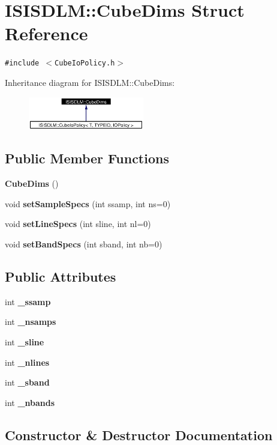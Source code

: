 \section{ISISDLM::Cube\-Dims Struct Reference}
\label{structISISDLM_1_1CubeDims}
{\tt \#include $<$Cube\-Io\-Policy.h$>$}

Inheritance diagram for ISISDLM::Cube\-Dims:\begin{figure}[H]
\begin{center}
\leavevmode
\includegraphics[width=143pt]{structISISDLM_1_1CubeDims__inherit__graph}
\end{center}
\end{figure}
\subsection*{Public Member Functions}
\begin{CompactItemize}
\item 
{\bf Cube\-Dims} ()
\item 
void {\bf set\-Sample\-Specs} (int ssamp, int ns=0)
\item 
void {\bf set\-Line\-Specs} (int sline, int nl=0)
\item 
void {\bf set\-Band\-Specs} (int sband, int nb=0)
\end{CompactItemize}
\subsection*{Public Attributes}
\begin{CompactItemize}
\item 
int {\bf \_\-ssamp}
\item 
int {\bf \_\-nsamps}
\item 
int {\bf \_\-sline}
\item 
int {\bf \_\-nlines}
\item 
int {\bf \_\-sband}
\item 
int {\bf \_\-nbands}
\end{CompactItemize}


\subsection{Constructor \& Destructor Documentation}
